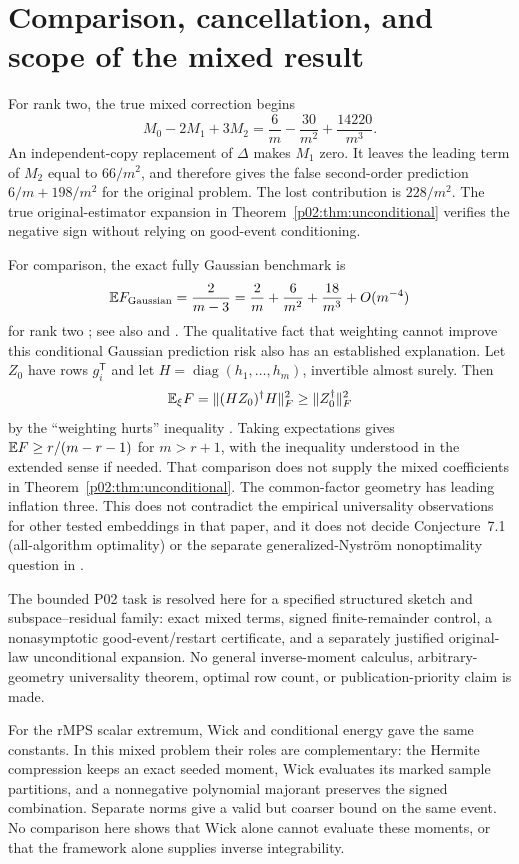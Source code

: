 \documentclass[11pt]{article}
\numberwithin{equation}{section}
\theoremstyle{definition}\newtheorem{definition}[theorem]{Definition}
\theoremstyle{remark}\newtheorem{remark}[theorem]{Remark}
\newcommand{\norm}[1]{\lVert#1\rVert}\newcommand{\ip}[2]{\langle#1,#2\rangle}
\newcommand{\diag}{\operatorname{diag}}
\begin{document}
\par{}
\section{Comparison, cancellation, and scope of the mixed result}\label{p02:sec:scope}
For rank two, the true mixed correction begins
\[
 M_0-2M_1+3M_2=\frac6m-\frac{30}{m^2}+\frac{14220}{m^3}.
\]
An independent-copy replacement of \(\Delta\) makes \(M_1\) zero. It leaves the leading term of \(M_2\) equal to \(66/m^2\), and therefore gives the false second-order prediction \(6/m+198/m^2\) for the original problem. The lost contribution is \(228/m^2\). The true original-estimator expansion in Theorem~\ref{p02:thm:unconditional} verifies the negative sign without relying on good-event conditioning.

For comparison, the exact fully Gaussian benchmark is
\[
 \mathbb E F_{\rm Gaussian}=\frac2{m-3}
 =\frac2m+\frac6{m^2}+\frac{18}{m^3}+O(m^{-4})
\]
for rank two \cite[Lemma~A.5]{TYUC2017}; see also \cite[Lemma~1 in arXiv v2]{BP2020} and \cite[Theorem~2.1]{EW}. The qualitative fact that weighting cannot improve this conditional
Gaussian prediction risk also has an established explanation. Let $Z_0$
have rows $g_i^{\mathsf T}$ and let $H=\diag(h_1,\ldots,h_m)$, invertible
almost surely. Then
\[
 \E_\xi F=\norm{(HZ_0)^\dagger H}_F^2
 \ge\norm{Z_0^\dagger}_F^2
\]
by the ``weighting hurts'' inequality \cite[Lemma~5.8]{EW}.
Taking expectations gives $\mathbb E F\ge r/(m-r-1)$ for $m>r+1$,
with the inequality understood in the extended sense if needed.
That comparison does not supply the mixed coefficients in
Theorem~\ref{p02:thm:unconditional}. The common-factor geometry has leading inflation three. This does not contradict the empirical universality observations for other tested embeddings in that paper, and it does not decide Conjecture~7.1 (all-algorithm optimality) or the separate generalized-Nystr\"om
nonoptimality question in \cite[Section~7]{EW}.

The bounded P02 task is resolved here for a specified structured sketch and subspace--residual family: exact mixed terms, signed finite-remainder control, a nonasymptotic good-event/restart certificate, and a separately justified original-law unconditional expansion. No general inverse-moment calculus, arbitrary-geometry universality theorem, optimal row count, or publication-priority claim is made.



\begin{takeaway}[title={What Chain C adds to the two-proof comparison}]
For the rMPS scalar extremum, Wick and conditional energy gave the same
constants. In this mixed problem their roles are complementary: the Hermite
compression keeps an exact seeded moment, Wick evaluates its marked sample
partitions, and a nonnegative polynomial majorant preserves the signed
combination. Separate norms give a valid but coarser bound on the same event.
No comparison here shows that Wick alone cannot evaluate these moments, or
that the framework alone supplies inverse integrability.
\end{takeaway}
\end{document}
